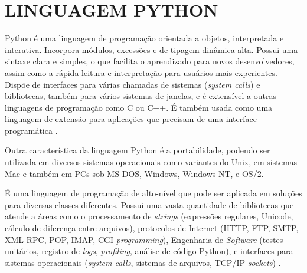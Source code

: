 %

\section{LINGUAGEM PYTHON}\label{sec:python}
Python é uma linguagem de programação orientada a objetos, interpretada e interativa. Incorpora módulos, excessões e de tipagem dinâmica alta. Possui uma sintaxe clara e simples, o que facilita o aprendizado para novos desenvolvedores, assim como a rápida leitura e interpretação para usuários mais experientes. Dispõe de interfaces para várias chamadas de sistemas (\textit{system calls}) e bibliotecas, também para vários sistemas de janelas, e é extensível a outras linguagens de programação como C ou C++. É também usada como uma linguagem de extensão para aplicações que precisam de uma interface programática \cite{python-doc}.

Outra característica da linguagem Python é a portabilidade, podendo ser utilizada em diversos sistemas operacionais como variantes do Unix, em sistemas Mac e também em PCs sob MS-DOS, Windows, Windows-NT, e OS/2.

É uma linguagem de programação de alto-nível que pode ser aplicada em soluções para diversas classes diferentes. Possui uma vasta quantidade de bibliotecas que atende a áreas como o processamento de \textit{strings} (expressões regulares, Unicode, cálculo de diferença entre arquivos), protocolos de Internet (HTTP, FTP, SMTP, XML-RPC, POP, IMAP, CGI \textit{programming}), Engenharia de \textit{Software} (testes unitários, registro de \textit{logs}, \textit{profiling}, análise de código Python), e interfaces para sistemas operacionais (\textit{system calls}, sistemas de arquivos, TCP/IP \textit{sockets}) \cite{python-doc}.

